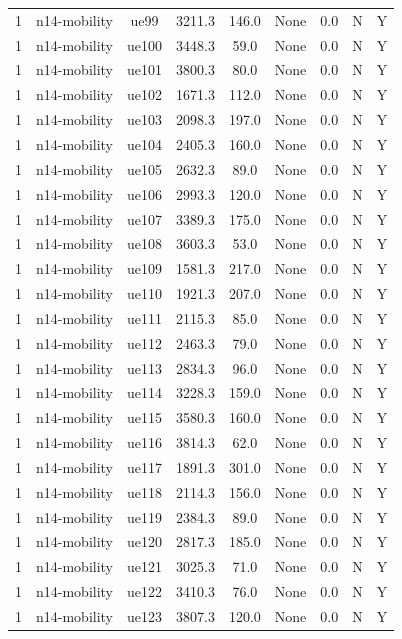 \begin{table}[ht]
\begin{tabular}{|c|c|c|c|c|c|c|c|c|}
1 & n14-mobility & ue99 & 3211.3 & 146.0 & None & 0.0 & N & Y \\
1 & n14-mobility & ue100 & 3448.3 & 59.0 & None & 0.0 & N & Y \\
1 & n14-mobility & ue101 & 3800.3 & 80.0 & None & 0.0 & N & Y \\
1 & n14-mobility & ue102 & 1671.3 & 112.0 & None & 0.0 & N & Y \\
1 & n14-mobility & ue103 & 2098.3 & 197.0 & None & 0.0 & N & Y \\
1 & n14-mobility & ue104 & 2405.3 & 160.0 & None & 0.0 & N & Y \\
1 & n14-mobility & ue105 & 2632.3 & 89.0 & None & 0.0 & N & Y \\
1 & n14-mobility & ue106 & 2993.3 & 120.0 & None & 0.0 & N & Y \\
1 & n14-mobility & ue107 & 3389.3 & 175.0 & None & 0.0 & N & Y \\
1 & n14-mobility & ue108 & 3603.3 & 53.0 & None & 0.0 & N & Y \\
1 & n14-mobility & ue109 & 1581.3 & 217.0 & None & 0.0 & N & Y \\
1 & n14-mobility & ue110 & 1921.3 & 207.0 & None & 0.0 & N & Y \\
1 & n14-mobility & ue111 & 2115.3 & 85.0 & None & 0.0 & N & Y \\
1 & n14-mobility & ue112 & 2463.3 & 79.0 & None & 0.0 & N & Y \\
1 & n14-mobility & ue113 & 2834.3 & 96.0 & None & 0.0 & N & Y \\
1 & n14-mobility & ue114 & 3228.3 & 159.0 & None & 0.0 & N & Y \\
1 & n14-mobility & ue115 & 3580.3 & 160.0 & None & 0.0 & N & Y \\
1 & n14-mobility & ue116 & 3814.3 & 62.0 & None & 0.0 & N & Y \\
1 & n14-mobility & ue117 & 1891.3 & 301.0 & None & 0.0 & N & Y \\
1 & n14-mobility & ue118 & 2114.3 & 156.0 & None & 0.0 & N & Y \\
1 & n14-mobility & ue119 & 2384.3 & 89.0 & None & 0.0 & N & Y \\
1 & n14-mobility & ue120 & 2817.3 & 185.0 & None & 0.0 & N & Y \\
1 & n14-mobility & ue121 & 3025.3 & 71.0 & None & 0.0 & N & Y \\
1 & n14-mobility & ue122 & 3410.3 & 76.0 & None & 0.0 & N & Y \\
1 & n14-mobility & ue123 & 3807.3 & 120.0 & None & 0.0 & N & Y \\

\end{tabular}
\end{table}
